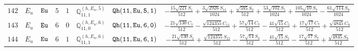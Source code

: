 \documentclass[fleqn,8pt]{jsarticle}
\begin{document}
\begin{table}[ht!]
\begin{center}
\begin{tabular}{cccccccc}
$ 142 $ & $ E_{u} $ & $ {\tt Eu} $ & $ 5 $ & $ 1 $ & $ \mathbb{Q}_{11,1}^{(h,E_{u},5)} $ & $ {\tt Qh(11,Eu,5,1)} $ & $ - \frac{15 \sqrt{221} S_{1}}{512} + \frac{3 \sqrt{2926} S_{11}}{1024} + \frac{\sqrt{595} S_{3}}{512} + \frac{53 \sqrt{102} S_{5}}{1024} + \frac{105 \sqrt{10} S_{7}}{1024} - \frac{61 \sqrt{114} S_{9}}{1024} $ \\
$ 143 $ & $ E_{u} $ & $ {\tt Eu} $ & $ 6 $ & $ 0 $ & $ \mathbb{Q}_{11,0}^{(h,E_{u},6)} $ & $ {\tt Qh(11,Eu,6,0)} $ & $ - \frac{21 \sqrt{130} C_{1}}{512} - \frac{\sqrt{124355} C_{11}}{512} + \frac{57 \sqrt{14} C_{3}}{512} - \frac{41 \sqrt{15} C_{5}}{512} + \frac{17 \sqrt{17} C_{7}}{512} + \frac{\sqrt{4845} C_{9}}{512} $ \\
$ 144 $ & $ E_{u} $ & $ {\tt Eu} $ & $ 6 $ & $ 1 $ & $ \mathbb{Q}_{11,1}^{(h,E_{u},6)} $ & $ {\tt Qh(11,Eu,6,1)} $ & $ - \frac{21 \sqrt{130} S_{1}}{512} + \frac{\sqrt{124355} S_{11}}{512} - \frac{57 \sqrt{14} S_{3}}{512} - \frac{41 \sqrt{15} S_{5}}{512} - \frac{17 \sqrt{17} S_{7}}{512} + \frac{\sqrt{4845} S_{9}}{512} $ \\
 \hline \hline
\end{tabular}
\end{center}
\end{table}
\end{document}
